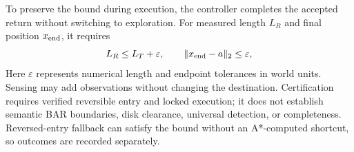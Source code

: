 To preserve the bound during execution, the controller completes the accepted return without switching to exploration. For measured length $L_R$ and final position $x_{\rm end}$, it requires
\begin{equation}
L_R\leq L_T+\varepsilon,\qquad
\|x_{\rm end}-a\|_2\leq\varepsilon,
\label{eq:return}
\end{equation}
Here $\varepsilon$ represents numerical length and endpoint tolerances in world units. Sensing may add observations without changing the destination. Certification requires verified reversible entry and locked execution; it does not establish semantic BAR boundaries, disk clearance, universal detection, or completeness. Reversed-entry fallback can satisfy the bound without an A*-computed shortcut, so outcomes are recorded separately.
